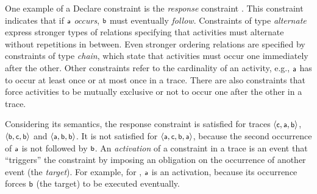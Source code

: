 
One example of a Declare constraint is the \emph{response} constraint \Resp{\taska}{\taskb}. This constraint indicates that if $\taska$ {\it occurs}, $\taskb$ must eventually {\it follow}.
Constraints of type \emph{alternate} express stronger types of relations specifying that activities must alternate without repetitions in between.
%
Even stronger ordering relations are specified by constraints of type \emph{chain}, which state that activities must occur one immediately after the other.
Other constraints refer to the cardinality of an activity, e.g., $\taska$ has to occur at least once or at most once in a trace. There are also constraints that force activities to be mutually exclusive or not to occur one after the other in a trace.

Considering its semantics, the response constraint \Resp{\taska}{\taskb} is satisfied for traces
$\langle \taskc, \taska, \taskb \rangle$, $\langle \taskb, \taskc, \taskb \rangle$ and $\langle \taska, \taskb, \taskb \rangle$.
It is not satisfied for $\langle
\taska, \taskc, \taskb, \taska \rangle$, because the second occurrence of $\taska$ is not followed by $\taskb$.
An \emph{activation} of a constraint in a trace is an event that ``triggers'' the constraint by imposing an obligation on the occurrence of another event (the \emph{target}). For example, for \Resp{\taska}{\taskb}, $\taska$ is an activation, because its occurrence forces $\taskb$ (the target) to be executed eventually.


%
%
%
%
%


